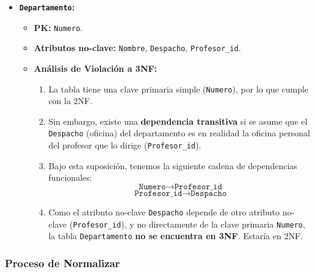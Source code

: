 \begin{itemize}
    \item \textbf{\texttt{Departamento}:}
    \begin{itemize}
        \item \textbf{PK:} \texttt{Numero}.
        \item \textbf{Atributos no-clave:} \texttt{Nombre}, \texttt{Despacho}, \texttt{Profesor\_id}.
        \item \textbf{Análisis de Violación a 3NF:}
        \begin{enumerate}
            \item La tabla tiene una clave primaria simple (\texttt{Numero}), por lo que cumple con la 2NF.
            \item Sin embargo, existe una \textbf{dependencia transitiva} si se asume que el \texttt{Despacho} (oficina) del departamento es en realidad la oficina personal del profesor que lo dirige (\texttt{Profesor\_id}).
            \item Bajo esta suposición, tenemos la siguiente cadena de dependencias funcionales:
            \[ \texttt{Numero} \rightarrow \texttt{Profesor\_id} \]
            \[ \texttt{Profesor\_id} \rightarrow \texttt{Despacho} \]
            \item Como el atributo no-clave \texttt{Despacho} depende de otro atributo no-clave (\texttt{Pro\-fe\-sor\_\-id}), y no directamente de la clave primaria \texttt{Numero}, la tabla \texttt{De\-par\-ta\-men\-to} \textbf{no se encuentra en 3NF}. Estaría en 2NF.
        \end{enumerate}
    \end{itemize}
\end{itemize}

\subsubsection{Proceso de Normalizar}

